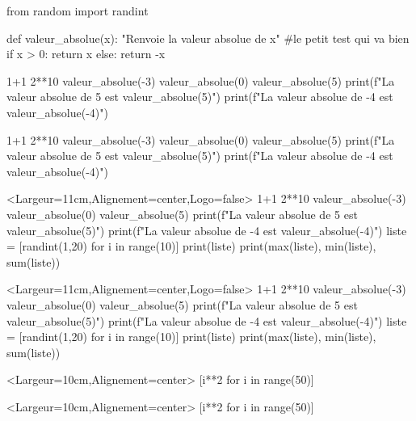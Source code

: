 \documentclass[french,a4paper,10pt]{article}
\begin{document}
\begin{python}
from random import randint

def valeur_absolue(x):
	"Renvoie la valeur absolue de x"
	#le petit test qui va bien
	if x > 0:
		return x
	else:
		return -x
\end{python}

{\small \begin{codehigh}
\begin{ConsolePiton}{}
1+1
2**10
valeur_absolue(-3)
valeur_absolue(0)
valeur_absolue(5)
print(f"La valeur absolue de 5 est {valeur_absolue(5)}")
print(f"La valeur absolue de -4 est {valeur_absolue(-4)}")
\end{ConsolePiton}
\end{codehigh}}

\begin{ConsolePiton}{}
1+1
2**10
valeur_absolue(-3)
valeur_absolue(0)
valeur_absolue(5)
print(f"La valeur absolue de 5 est {valeur_absolue(5)}")
print(f"La valeur absolue de -4 est {valeur_absolue(-4)}")
\end{ConsolePiton}

\pagebreak

{\small \begin{codehigh}
\begin{ConsolePiton}<Largeur=11cm,Alignement=center,Logo=false>{}
1+1
2**10
valeur_absolue(-3)
valeur_absolue(0)
valeur_absolue(5)
print(f"La valeur absolue de 5 est {valeur_absolue(5)}")
print(f"La valeur absolue de -4 est {valeur_absolue(-4)}")
liste = [randint(1,20) for i in range(10)]
print(liste)
print(max(liste), min(liste), sum(liste))
\end{ConsolePiton}
\end{codehigh}}

\begin{ConsolePiton}<Largeur=11cm,Alignement=center,Logo=false>{}
1+1
2**10
valeur_absolue(-3)
valeur_absolue(0)
valeur_absolue(5)
print(f"La valeur absolue de 5 est {valeur_absolue(5)}")
print(f"La valeur absolue de -4 est {valeur_absolue(-4)}")
liste = [randint(1,20) for i in range(10)]
print(liste)
print(max(liste), min(liste), sum(liste))
\end{ConsolePiton}

{\small \begin{codehigh}
\begin{ConsolePiton}<Largeur=10cm,Alignement=center>{}
[i**2 for i in range(50)]
\end{ConsolePiton}
\end{codehigh}}

\begin{ConsolePiton}<Largeur=10cm,Alignement=center>{}
[i**2 for i in range(50)]
\end{ConsolePiton}
\end{document}
